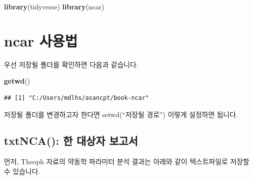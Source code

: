 \documentclass[12pt,]{krantz}
\newenvironment{Shaded}{\begin{snugshade}}{\end{snugshade}}
\newcommand{\KeywordTok}[1]{\textcolor[rgb]{0.13,0.29,0.53}{\textbf{#1}}}
\newcommand{\DataTypeTok}[1]{\textcolor[rgb]{0.13,0.29,0.53}{#1}}
\newcommand{\DecValTok}[1]{\textcolor[rgb]{0.00,0.00,0.81}{#1}}
\newcommand{\StringTok}[1]{\textcolor[rgb]{0.31,0.60,0.02}{#1}}
\newcommand{\OperatorTok}[1]{\textcolor[rgb]{0.81,0.36,0.00}{\textbf{#1}}}
\newcommand{\NormalTok}[1]{#1}
\theoremstyle{definition}
\theoremstyle{definition}
\theoremstyle{definition}
\theoremstyle{remark}
\begin{document}
\begin{Shaded}
\begin{Highlighting}[]
\KeywordTok{library}\NormalTok{(tidyverse)}
\KeywordTok{library}\NormalTok{(ncar)}
\end{Highlighting}
\end{Shaded}

\section{ncar 사용법}\label{ncar-}

우선 저장될 폴더를 확인하면 다음과 같습니다.

\begin{Shaded}
\begin{Highlighting}[]
\KeywordTok{getwd}\NormalTok{()}
\end{Highlighting}
\end{Shaded}

\begin{verbatim}
## [1] "C:/Users/mdlhs/asancpt/book-ncar"
\end{verbatim}

저장될 폴더를 변경하고자 한다면 setwd(``저장될 경로'') 이렇게 설정하면
됩니다.

\subsection{txtNCA(): 한 대상자 보고서}\label{txtnca---}

\begin{Shaded}
\end{Shaded}

먼저, Theoph 자료의 약동학 파라미터 분석 결과는 아래와 같이 텍스트파일로
저장할 수 있습니다.
\end{document}
